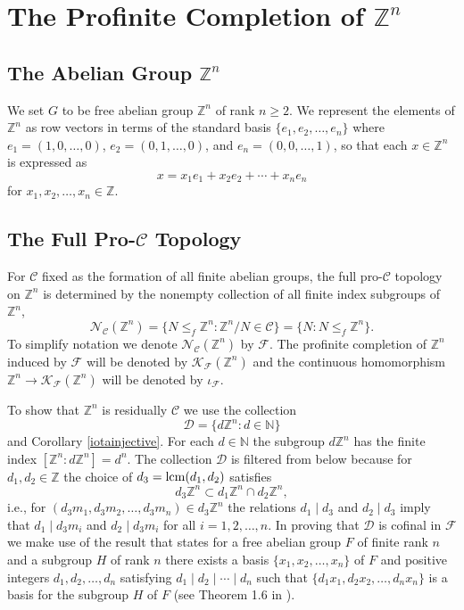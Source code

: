 \documentclass{amsart}
\theoremstyle{plain}
\theoremstyle{definition}
\theoremstyle{remark}
\begin{document}
\section{The Profinite Completion of ${\mathbb Z}^n$}

\subsection{The Abelian Group ${\mathbb Z}^n$} We set $G$ to be free abelian group ${\mathbb Z}^n$ of rank $n\geq 2$. We represent the elements of ${\mathbb Z}^n$ as row vectors in terms of the standard basis $\{e_1,e_2,\dots,e_n\}$ where $e_1 = (1,0,\dots,0)$, $e_2=(0,1,\dots,0)$, and $e_n = (0,0,\dots,1)$, so that each $x\in {\mathbb Z}^n$ is expressed as
\[ x = x_1 e_1 + x_2 e_2 + \cdots + x_n e_n\]
for $x_1,x_2,\dots,x_n\in{\mathbb Z}$. 

\subsection{The Full Pro-${\mathcal C}$ Topology} For ${\mathcal C}$ fixed as the formation of all finite abelian groups, the full pro-${\mathcal C}$ topology on ${\mathbb Z}^n$ is determined by the nonempty collection of all finite index subgroups of ${\mathbb Z}^n$,
\[ {\mathcal N}_{\mathcal C}({\mathbb Z}^n) = \{N \leq_f {\mathbb Z}^n : {\mathbb Z}^n/N \in {\mathcal C}\} = \{N:N\leq_f {\mathbb Z}^n\}.\]
To simplify notation we denote ${\mathcal N}_{\mathcal C}({\mathbb Z}^n)$ by ${\mathcal F}$. The profinite completion of ${\mathbb Z}^n$ induced by ${\mathcal F}$ will be denoted by ${\mathcal K}_{\mathcal F}({\mathbb Z}^n)$ and the continuous homomorphism ${\mathbb Z}^n \to  {\mathcal K}_{\mathcal F}({\mathbb Z}^n)$ will be denoted by $\iota_{\mathcal F}$. 

To show that ${\mathbb Z}^n$ is residually ${\mathcal C}$ we use the collection
\[ {\mathcal D} = \{ d{\mathbb Z}^n: d\in {\mathbb N}\}\]
and Corollary \ref{iotainjective}. For each $d\in {\mathbb N}$ the subgroup $d{\mathbb Z}^n$ has the finite index $[{\mathbb Z}^n:d{\mathbb Z}^n] = d^n$. The collection ${\mathcal D}$ is filtered from below because for $d_1,d_2\in {\mathbb Z}$ the choice of $d_3 = {\rm lcm}(d_1,d_2)$ satisfies
\[ d_3{\mathbb Z}^n \subset d_1{\mathbb Z}^n \cap d_2{\mathbb Z}^n,\]
i.e., for $(d_3m_1,d_3m_2,\dots,d_3m_n)\in d_3{\mathbb Z}^n$ the relations $d_1\mid d_3$ and $d_2\mid d_3$ imply that $d_1\mid d_3 m_i$ and $d_2\mid d_3 m_i$ for all $i=1,2,\dots,n$. In proving that ${\mathcal D}$ is cofinal in ${\mathcal F}$ we make use of the result that states for a free abelian group $F$ of finite rank $n$ and a subgroup $H$ of rank $n$ there exists a basis $\{x_1,x_2,\dots,x_n\}$ of $F$ and positive integers $d_1,d_2,\dots,d_n$ satisfying $d_1\mid d_2\mid \cdots \mid d_n$ such that $\{ d_1x_1,d_2x_2,\dots,d_nx_n\}$ is a basis for the subgroup $H$ of $F$ (see Theorem 1.6 in \cite{Hu74}).
\end{document}
